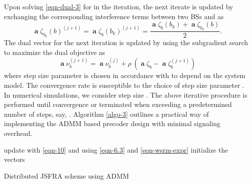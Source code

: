 Upon solving \eqref{eqn-dual-3} for  in the  iteration, the next iterate is updated by exchanging the corresponding interference terms between two \acp{BS}  and  as
\begin{equation}
\mbfa{\zeta}_{b_k}(b)^{(j+1)} = \mbfa{\zeta}_{b}(b_k)^{(j+1)} = \frac{\mbfa{\zeta}_{b}(b_k) + \mbfa{\zeta}_{b_k}(b)}{2}.
\label{if-sg-update}
\end{equation}
The dual vector for the next iteration is updated by using the subgradient search to maximize the dual objective as
\begin{equation}
\mbfa{\nu}_b^{(j+1)} = \mbfa{\nu}_b^{(j)} + \rho \: (\mbfa{\zeta}_b - \mbfa{\zeta}_b^{(j+1)}  )
\label{dual-sg-update}
\end{equation}
where step size parameter \me{\rho} is chosen in accordance with \cite{boyd2011distributed} to depend on the system model. The convergence rate is susceptible to the choice of step size parameter \me{\rho}. In numerical simulations, we consider step size . The above iterative procedure is performed until convergence or terminated when exceeding a predetermined number of steps, say, . Algorithm \ref{algo-3} outlines a practical way of implementing the \ac{ADMM} based precoder design with minimal signaling overhead.
\begin{algorithm}
	\SetAlgoLined
	\DontPrintSemicolon
	\BlankLine
	update  with \eqref{eqn-10} and  using \eqref{eqn-6.3} and \eqref{eqn-wsrm-expr} \;
	initialize the vectors  \;
	\caption{Distributed \ac{JSFRA} scheme using \ac{ADMM}}
	\label{algo-3}
\end{algorithm}
